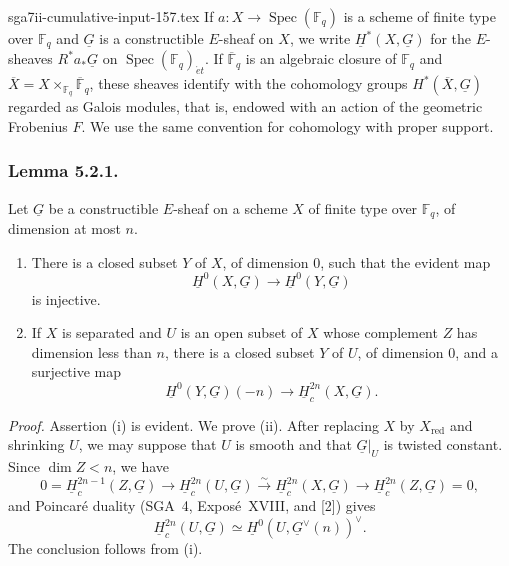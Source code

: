 \begin{filecontents*}{sga7ii-cumulative-input-157.tex}
If $a:X\longrightarrow\operatorname{Spec}(\mathbb F_q)$ is a scheme of
finite type over $\mathbb F_q$ and $\underline G$ is a constructible
$E$-sheaf on $X$, we write $\underline H^*(X,\underline G)$ for the
$E$-sheaves $R^*a_*\underline G$ on
$\operatorname{Spec}(\mathbb F_q)_{\acute e t}$.  If
$\overline{\mathbb F}_q$ is an algebraic closure of $\mathbb F_q$ and
$\overline X=X\times_{\mathbb F_q}\overline{\mathbb F}_q$, these sheaves
identify with the cohomology groups $H^*(\overline X,\underline G)$ regarded
as Galois modules, that is, endowed with an action of the geometric
Frobenius $F$.  We use the same convention for cohomology with proper
support.

\subsubsection*{Lemma 5.2.1.}
Let $\underline G$ be a constructible $E$-sheaf on a scheme $X$ of finite
type over $\mathbb F_q$, of dimension at most $n$.

\begin{enumerate}[label=(\roman*)]
\item There is a closed subset $Y$ of $X$, of dimension $0$, such that the
  evident map
  \[
  \underline H^0(X,\underline G)\longrightarrow
  \underline H^0(Y,\underline G)
  \]
  is injective.
\item If $X$ is separated and $U$ is an open subset of $X$ whose complement
  $Z$ has dimension less than $n$, there is a closed subset $Y$ of $U$, of
  dimension $0$, and a surjective map
  \[
  \underline H^0(Y,\underline G)(-n)\longrightarrow
  \underline H_c^{2n}(X,\underline G).
  \]
\end{enumerate}

\medskip
\noindent\emph{Proof.}
Assertion (i) is evident.  We prove (ii).  After replacing $X$ by
$X_{\mathrm{red}}$ and shrinking $U$, we may suppose that $U$ is smooth and
that $\underline G|_U$ is twisted constant.  Since $\dim Z<n$, we have
\[
0=\underline H_c^{2n-1}(Z,\underline G)
\longrightarrow \underline H_c^{2n}(U,\underline G)
\xrightarrow{\sim}\underline H_c^{2n}(X,\underline G)
\longrightarrow \underline H_c^{2n}(Z,\underline G)=0,
\]
and Poincar\'e duality (SGA~4, Expos\'e~XVIII, and [2]) gives
\[
\underline H_c^{2n}(U,\underline G)\simeq
\underline H^0(U,\underline G^\vee(n))^\vee.
\]
The conclusion follows from (i).
\end{filecontents*}
